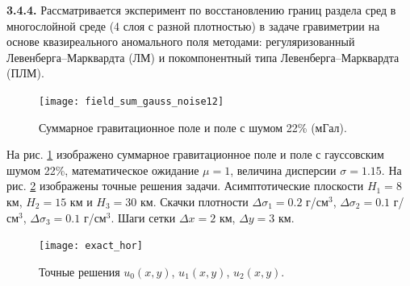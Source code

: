 
{\bfseries 3.4.4.} Рассматривается эксперимент по восстановлению границ раздела сред в многослойной среде (4 слоя с разной плотностью) в задаче гравиметрии на основе квазиреального аномального поля методами: регуляризованный Левенберга--Марквардта (ЛМ) и покомпонентный типа Левенберга--Марквардта (ПЛМ).
\begin{figure}
	\centering
	\texttt{[image: field\_sum\_gauss\_noise12]}
	\caption{Суммарное гравитационное поле и поле с шумом 22\% (мГал).}
	\label{fig:field_sum_gauss_noise12}
\end{figure}
На рис. \ref{fig:field_sum_gauss_noise12} изображено суммарное гравитационное поле и поле с гауссовским шумом 22\%, математическое ожидание $\mu=1$, величина дисперсии $\sigma=1.15$. На рис. \ref{fig:exact_hor} изображены точные решения задачи. Асимптотические плоскости $H_1=8$ км, $H_2=15$ км и $H_3=30$ км. Скачки плотности $\Delta\sigma_1=0.2$ г/см$^3$, $\Delta\sigma_2=0.1$ г/см$^3$, $\Delta\sigma_3=0.1$ г/см$^3$. Шаги сетки $\Delta x=2$ км, $\Delta y=3$ км.
\begin{figure}
	\centering
	\texttt{[image: exact\_hor]}
	\caption{Точные решения $u_0(x,y)$, $u_1(x,y)$, $u_2(x,y)$.}
	\label{fig:exact_hor}
\end{figure}

